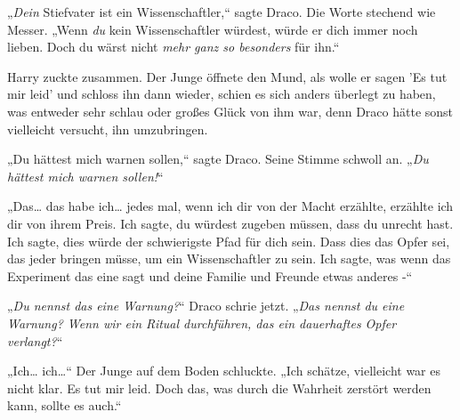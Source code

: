 „\emph{Dein} Stiefvater ist ein Wissenschaftler,“ sagte Draco. Die Worte stechend wie Messer. „Wenn \emph{du} kein Wissenschaftler würdest, würde er dich immer noch lieben. Doch du wärst nicht \emph{mehr ganz so besonders} für ihn.“

Harry zuckte zusammen. Der Junge öffnete den Mund, als wolle er sagen 'Es tut mir leid' und schloss ihn dann wieder, schien es sich anders überlegt zu haben, was entweder sehr schlau oder großes Glück von ihm war, denn Draco hätte sonst vielleicht versucht, ihn umzubringen.

„Du hättest mich warnen sollen,“ sagte Draco. Seine Stimme schwoll an. „\emph{Du hättest mich warnen sollen!}“

„Das… das habe ich… jedes mal, wenn ich dir von der Macht erzählte, erzählte ich dir von ihrem Preis. Ich sagte, du würdest zugeben müssen, dass du unrecht hast. Ich sagte, dies würde der schwierigste Pfad für dich sein. Dass dies das Opfer sei, das jeder bringen müsse, um ein Wissenschaftler zu sein. Ich sagte, was wenn das Experiment das eine sagt und deine Familie und Freunde etwas anderes -“

„\emph{Du nennst das eine Warnung?}“ Draco schrie jetzt. „\emph{Das nennst du eine Warnung? Wenn wir ein Ritual durchführen, das ein dauerhaftes Opfer verlangt?}“

„Ich… ich…“ Der Junge auf dem Boden schluckte. „Ich schätze, vielleicht war es nicht klar. Es tut mir leid. Doch das, was durch die Wahrheit zerstört werden kann, sollte es auch.“

